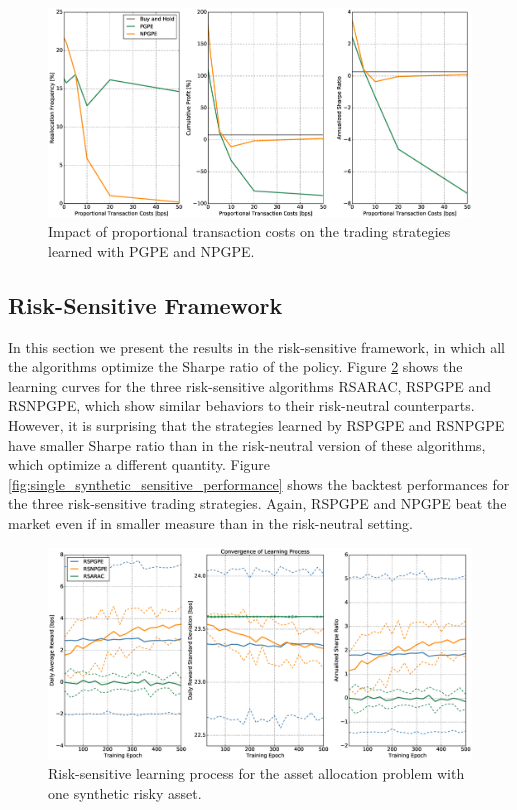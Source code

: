 \begin{figure}[t!]
	\centering
	\includegraphics[width=1.0\textwidth]{Images/6_4_impact_transaction_costs}
	\caption[Impact of proportional transaction costs]{Impact of proportional transaction costs on the trading strategies learned with PGPE and NPGPE.}
	\label{fig:impact_transaction_costs}
\end{figure}

\subsection{Risk-Sensitive Framework}
In this section we present the results in the risk-sensitive framework, in which all the algorithms optimize the Sharpe ratio of the policy. Figure \ref{fig:single_synthetic_sensitive_convergence} shows the learning curves for the three risk-sensitive algorithms RSARAC, RSPGPE and RSNPGPE, which show similar behaviors to their risk-neutral counterparts. However, it is surprising that the strategies learned by RSPGPE and RSNPGPE have smaller Sharpe ratio than in the risk-neutral version of these algorithms, which optimize a different quantity. Figure \ref{fig:single_synthetic_sensitive_performance} shows the backtest performances for the three risk-sensitive trading strategies. Again, RSPGPE and NPGPE beat the market even if in smaller measure than in the risk-neutral setting. 

\begin{figure}[b!]
	\centering
	\includegraphics[width=1.0\textwidth]{Images/6_2_single_synthetic_sensitive_convergence}
	\caption[Risk-sensitive learning process for one synthetic risky asset]{Risk-sensitive learning process for the asset allocation problem with one synthetic risky asset.}
	\label{fig:single_synthetic_sensitive_convergence}
\end{figure}

